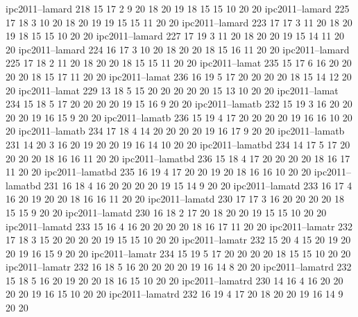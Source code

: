 ipc2011--lamard   218  15   17   2    9    20   18   20   19   18   15   15   10   20   20
ipc2011--lamard   225  17   18   3    10   20   18   20   19   19   15   15   11   20   20
ipc2011--lamard   223  17   17   3    11   20   18   20   19   18   15   15   10   20   20
ipc2011--lamard   227  17   19   3    11   20   18   20   20   19   15   14   11   20   20
ipc2011--lamard   224  16   17   3    10   20   18   20   20   18   15   16   11   20   20
ipc2011--lamard   225  17   18   2    11   20   18   20   20   18   15   15   11   20   20
ipc2011--lamat    235  15   17   6    16   20   20   20   20   18   15   17   11   20   20
ipc2011--lamat    236  16   19   5    17   20   20   20   20   18   15   14   12   20   20
ipc2011--lamat    229  13   18   5    15   20   20   20   20   20   15   13   10   20   20
ipc2011--lamat    234  15   18   5    17   20   20   20   20   19   15   16   9    20   20
ipc2011--lamatb   232  15   19   3    16   20   20   20   20   19   16   15   9    20   20
ipc2011--lamatb   236  15   19   4    17   20   20   20   20   19   16   16   10   20   20
ipc2011--lamatb   234  17   18   4    14   20   20   20   20   19   16   17   9    20   20
ipc2011--lamatb   231  14   20   3    16   20   19   20   20   19   16   14   10   20   20
ipc2011--lamatbd  234  14   17   5    17   20   20   20   20   18   16   16   11   20   20
ipc2011--lamatbd  236  15   18   4    17   20   20   20   20   18   16   17   11   20   20
ipc2011--lamatbd  235  16   19   4    17   20   20   19   20   18   16   16   10   20   20
ipc2011--lamatbd  231  16   18   4    16   20   20   20   20   19   15   14   9    20   20
ipc2011--lamatd   233  16   17   4    16   20   19   20   20   18   16   16   11   20   20
ipc2011--lamatd   230  17   17   3    16   20   20   20   20   18   15   15   9    20   20
ipc2011--lamatd   230  16   18   2    17   20   18   20   20   19   15   15   10   20   20
ipc2011--lamatd   233  15   16   4    16   20   20   20   20   18   16   17   11   20   20
ipc2011--lamatr   232  17   18   3    15   20   20   20   20   19   15   15   10   20   20
ipc2011--lamatr   232  15   20   4    15   20   19   20   20   19   16   15   9    20   20
ipc2011--lamatr   234  15   19   5    17   20   20   20   20   18   15   15   10   20   20
ipc2011--lamatr   232  16   18   5    16   20   20   20   20   19   16   14   8    20   20
ipc2011--lamatrd  232  15   18   5    16   20   19   20   20   18   16   15   10   20   20
ipc2011--lamatrd  230  14   16   4    16   20   20   20   20   19   16   15   10   20   20
ipc2011--lamatrd  232  16   19   4    17   20   18   20   20   19   16   14   9    20   20
